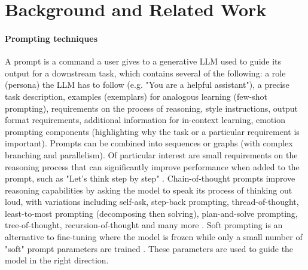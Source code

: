\documentclass{article}
\begin{document}
\section{Background and Related Work}
\label{related-work}


\paragraph{Prompting techniques} A prompt is a command a user gives to a generative LLM used to guide its output for a downstream task, which contains several of the following: a role (persona) the LLM has to follow (e.g. "You are a helpful assistant"), a precise task description, examples (exemplars) for analogous learning (few-shot prompting), requirements on the process of reasoning, style instructions, output format requirements, additional information for in-context learning, emotion prompting components (highlighting why the task or a particular requirement is important). Prompts can be combined into sequences or graphs (with complex branching and parallelism). Of particular interest are small requirements on the reasoning process that can significantly improve performance when added to the prompt, such as 
"Let’s think step by step" \cite{kojima2022large}. 
Chain-of-thought prompts improve reasoning capabilities by asking the model to speak its process of thinking out loud, with variations including self-ask, step-back prompting, thread-of-thought, least-to-most prompting (decomposing then solving), plan-and-solve prompting, tree-of-thought, recursion-of-thought and many more \cite{schulhoff2024prompt}. 
Soft prompting is an alternative to fine-tuning where the model is frozen while only a small number of "soft" prompt parameters are trained \cite{lester2021prompt}. These parameters are used to guide the model in the right direction.
\end{document}
